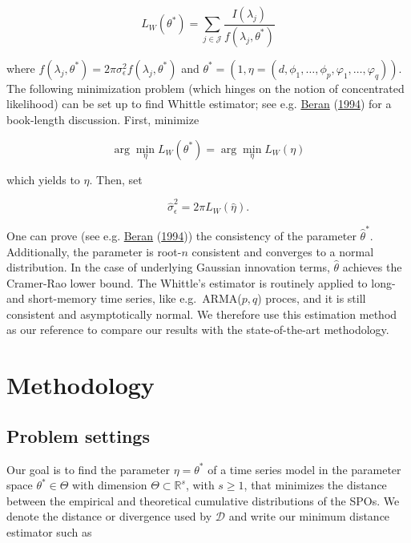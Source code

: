 \documentclass[
  11pt,
]{article}
\begin{document}
\begin{equation}
L_{W}\left(\theta^{*}\right)=\sum_{j \in \mathcal{J}} \frac{I\left(\lambda_{j}\right)}{f\left(\lambda_{j}, \theta^{*}\right)}
\end{equation}

where
\(f\left(\lambda_{j}, \theta^{*}\right)=2 \pi \sigma_{\epsilon}^{2} f\left(\lambda_{j}, \theta^{*}\right)\)
and
\(\theta^{*}=\left(1, \eta=\left(d, \phi_{1}, \ldots, \phi_{p}, \varphi_{1}, \ldots, \varphi_{q}\right)\right)\).
The following minimization problem (which hinges on the notion of
concentrated likelihood) can be set up to find Whittle estimator; see
e.g. \protect\hyperlink{ref-beran1994statistics}{Beran}
(\protect\hyperlink{ref-beran1994statistics}{1994}) for a book-length
discussion. First, minimize

\[\arg \min _{\eta} L_{W}\left(\theta^{*}\right)=\arg \min _{\eta} L_{W}(\eta)\]

which yields to \(\hat{\eta}\). Then, set

\[\hat{\sigma}_{\epsilon}^{2}=2 \pi L_{W}(\hat{\eta}).\]

One can prove (see e.g.
\protect\hyperlink{ref-beran1994statistics}{Beran}
(\protect\hyperlink{ref-beran1994statistics}{1994})) the consistency of
the parameter \(\hat \theta^*\). Additionally, the parameter is
root-\(n\) consistent and converges to a normal distribution. In the
case of underlying Gaussian innovation terms, \(\hat \theta\) achieves
the Cramer-Rao lower bound. The Whittle's estimator is routinely applied
to long- and short-memory time series, like e.g.~ARMA(\(p,q\)) proces,
and it is still consistent and asymptotically normal. We therefore use
this estimation method as our reference to compare our results with the
state-of-the-art methodology.

\hypertarget{methodology}{%
\section{Methodology}\label{methodology}}

\hypertarget{problem-settings}{%
\subsection{Problem settings}\label{problem-settings}}

Our goal is to find the parameter \(\eta = \theta^*\) of a time series
model in the parameter space \(\theta^* \in \Theta\) with dimension
\(\Theta \subset \mathbb{R}^{s}\), with \(s \geq 1\), that minimizes the
distance between the empirical and theoretical cumulative distributions
of the SPOs. We denote the distance or divergence used by
\(\mathcal{D}\) and write our minimum distance estimator such as
\end{document}
